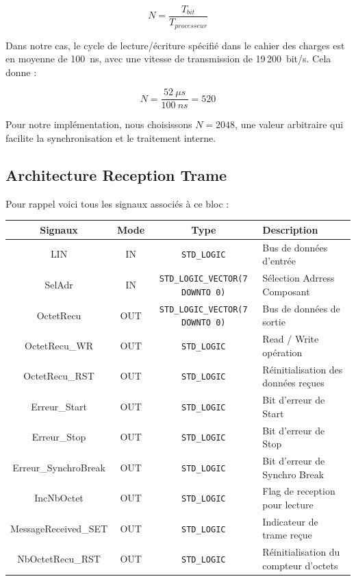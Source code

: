 \[
N = \frac{T_{bit}}{T_{processeur}}
\]

Dans notre cas, le cycle de lecture/écriture spécifié dans le cahier des charges est en moyenne de 100~ns, avec une vitesse de transmission de 19\,200~bit/s. Cela donne :

\[
N = \frac{52~\mu s}{100~ns} = 520
\]

Pour notre implémentation, nous choisissons \(N = 2048\), une valeur arbitraire qui facilite la synchronisation et le traitement interne.

\subsection{Architecture Reception Trame}

Pour rappel voici tous les signaux associés à ce bloc : 
\newline

\begin{center}
\renewcommand{\arraystretch}{1.2} %
\small %
    \begin{tabularx}{\textwidth}{|c||c|c|X|}
     \hline			
       \textbf{Signaux} & \textbf{Mode} & \textbf{Type} & \textbf{Description}  \\ \hline 
       LIN & IN & \texttt{STD\_LOGIC} & Bus de données d'entrée \\
       SelAdr & IN & \texttt{STD\_LOGIC\_VECTOR(7 DOWNTO 0)} & Sélection Adrress Composant \\
       OctetRecu & OUT & \texttt{STD\_LOGIC\_VECTOR(7 DOWNTO 0)} & Bus de données de sortie \\
       OctetRecu\_WR & OUT & \texttt{STD\_LOGIC} & Read / Write opération \\
       OctetRecu\_RST & OUT & \texttt{STD\_LOGIC} & Réinitialisation des données reçues \\
       Erreur\_Start & OUT & \texttt{STD\_LOGIC} & Bit d'erreur de Start \\
       Erreur\_Stop & OUT & \texttt{STD\_LOGIC} & Bit d'erreur de Stop\\
       Erreur\_SynchroBreak & OUT & \texttt{STD\_LOGIC} & Bit d'erreur de Synchro Break\\
       IncNbOctet & OUT & \texttt{STD\_LOGIC} & Flag de reception pour lecture \\
       MessageReceived\_SET & OUT & \texttt{STD\_LOGIC} & Indicateur de trame reçue \\
       NbOctetRecu\_RST & OUT & \texttt{STD\_LOGIC} & Réinitialisation du compteur d'octets \\
     \hline  
    \end{tabularx}
\end{center}

